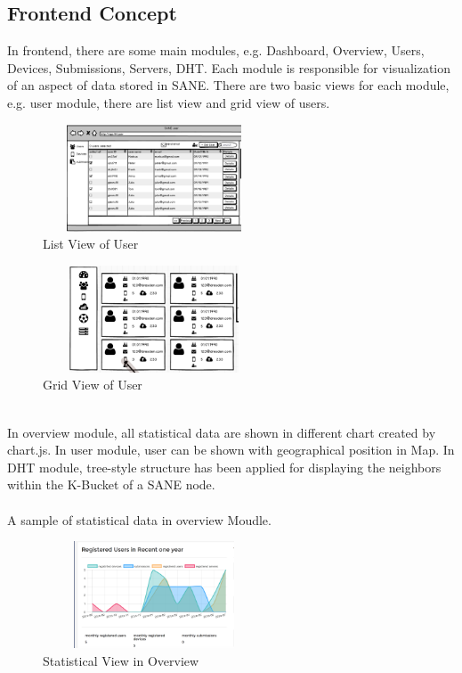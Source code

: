 \documentclass[12pt,oneside,a4paper]{article}
\begin{document}
\subsection{\large Frontend Concept}
In frontend, there are some main modules, e.g. Dashboard, Overview, Users, Devices, Submissions, Servers, DHT. Each module is responsible for visualization of an aspect of data stored in SANE. There are two basic views for each module, e.g. user module, there are list view and grid view of users.
\begin{figure}[htb]
\centering
\includegraphics[width=250px, height=120px]{gui.png}
\caption{List View of User}
\label{picture-label15}
\end{figure}
\begin{figure}[htb]
\centering
\includegraphics[width=250px, height=120px]{gridview.png}
\caption{Grid View of User}
\label{picture-label16}
\end{figure}\\
In overview module, all statistical data are shown in different chart created by chart.js. In user module, user can be shown with geographical position in Map. In DHT module, tree-style structure has been applied for displaying the neighbors within the K-Bucket of a SANE node.\\\\
A sample of statistical data in overview Moudle.\\
\begin{figure}[htb]
\centering
\includegraphics[width=250px, height=120px]{statis.png}
\caption{Statistical View in Overview}
\label{picture-label17}
\end{figure}\\
\end{document}
